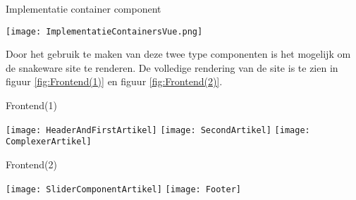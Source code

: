 \newpage

\whitespace
\begin{graphic}
    \captionsetup{type=figure}
    \caption{Implementatie container component}
    \texttt{[image: ImplementatieContainersVue.png]}
    \label{fig:FrontendContainerImplementatie}
\end{graphic}

\whitespace
Door het gebruik te maken van deze twee type componenten is het mogelijk om de snakeware site te renderen.
De volledige rendering van de site is te zien in figuur \ref{fig:Frontend(1)} en figuur \ref{fig:Frontend(2)}.

\newpage
\begin{graphic}
    \captionsetup{type=figure}
    \caption{Frontend(1)}
    \texttt{[image: HeaderAndFirstArtikel]}
    \texttt{[image: SecondArtikel]}
    \texttt{[image: ComplexerArtikel]}
    \label{fig:Frontend(1)}
\end{graphic}

\newpage
\begin{graphic}
    \captionsetup{type=figure}
    \caption{Frontend(2)}
    \texttt{[image: SliderComponentArtikel]}
    \texttt{[image: Footer]}
    \label{fig:Frontend(2)}
\end{graphic}
%
%
%
